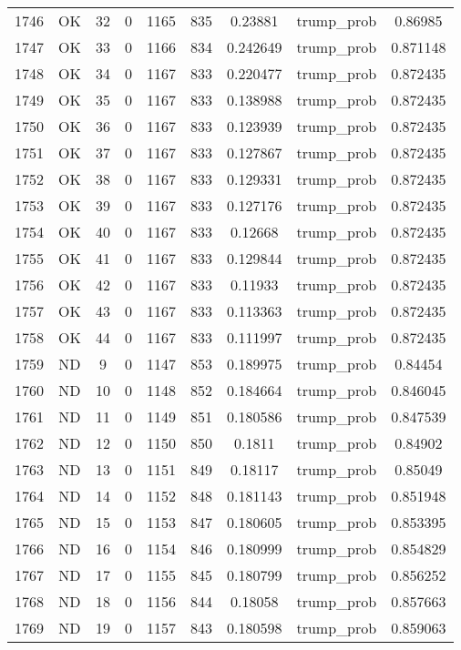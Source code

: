 \documentclass[12pt,a4paper]{article}
\begin{document}
\begin{tabular}{r|cccccccc}
	1746 & OK & 32 & 0 & 1165 & 835 & 0.23881 & trump\_prob & 0.86985 \\
	1747 & OK & 33 & 0 & 1166 & 834 & 0.242649 & trump\_prob & 0.871148 \\
	1748 & OK & 34 & 0 & 1167 & 833 & 0.220477 & trump\_prob & 0.872435 \\
	1749 & OK & 35 & 0 & 1167 & 833 & 0.138988 & trump\_prob & 0.872435 \\
	1750 & OK & 36 & 0 & 1167 & 833 & 0.123939 & trump\_prob & 0.872435 \\
	1751 & OK & 37 & 0 & 1167 & 833 & 0.127867 & trump\_prob & 0.872435 \\
	1752 & OK & 38 & 0 & 1167 & 833 & 0.129331 & trump\_prob & 0.872435 \\
	1753 & OK & 39 & 0 & 1167 & 833 & 0.127176 & trump\_prob & 0.872435 \\
	1754 & OK & 40 & 0 & 1167 & 833 & 0.12668 & trump\_prob & 0.872435 \\
	1755 & OK & 41 & 0 & 1167 & 833 & 0.129844 & trump\_prob & 0.872435 \\
	1756 & OK & 42 & 0 & 1167 & 833 & 0.11933 & trump\_prob & 0.872435 \\
	1757 & OK & 43 & 0 & 1167 & 833 & 0.113363 & trump\_prob & 0.872435 \\
	1758 & OK & 44 & 0 & 1167 & 833 & 0.111997 & trump\_prob & 0.872435 \\
	1759 & ND & 9 & 0 & 1147 & 853 & 0.189975 & trump\_prob & 0.84454 \\
	1760 & ND & 10 & 0 & 1148 & 852 & 0.184664 & trump\_prob & 0.846045 \\
	1761 & ND & 11 & 0 & 1149 & 851 & 0.180586 & trump\_prob & 0.847539 \\
	1762 & ND & 12 & 0 & 1150 & 850 & 0.1811 & trump\_prob & 0.84902 \\
	1763 & ND & 13 & 0 & 1151 & 849 & 0.18117 & trump\_prob & 0.85049 \\
	1764 & ND & 14 & 0 & 1152 & 848 & 0.181143 & trump\_prob & 0.851948 \\
	1765 & ND & 15 & 0 & 1153 & 847 & 0.180605 & trump\_prob & 0.853395 \\
	1766 & ND & 16 & 0 & 1154 & 846 & 0.180999 & trump\_prob & 0.854829 \\
	1767 & ND & 17 & 0 & 1155 & 845 & 0.180799 & trump\_prob & 0.856252 \\
	1768 & ND & 18 & 0 & 1156 & 844 & 0.18058 & trump\_prob & 0.857663 \\
	1769 & ND & 19 & 0 & 1157 & 843 & 0.180598 & trump\_prob & 0.859063 \\

\end{tabular}
\end{document}
